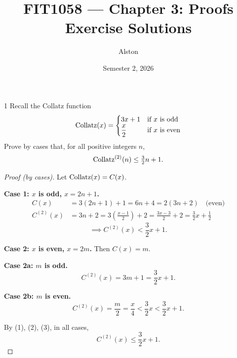 \documentclass[11pt]{article}
\title{FIT1058 --- Chapter 3: Proofs\\ \large Exercise Solutions}
\author{Alston}
\date{Semester 2, 2026}
\begin{document}
\maketitle

\begin{exercise}{1}
    Recall the Collatz function
    \[
        \operatorname{Collatz}(x) =
        \begin{cases}
            3x+1 & \text{if } x \text{ is odd} \\
            \dfrac{x}{2} & \text{if } x \text{ is even}
        \end{cases}
    \]
    Prove by cases that, for all positive integers $n$,
    \[
        \operatorname{Collatz}^{(2)}(n) \le \tfrac{3}{2}n + 1.
    \]
\end{exercise}
\begin{proof}[Proof (by cases)]
    Let $\operatorname{Collatz}(x) = C(x)$.

    \textbf{Case 1: $x$ is odd, $x=2n+1$.}
    \begin{align*}
        C(x) &= 3(2n+1)+1 = 6n+4 = 2(3n+2) \quad \text{(even)} \\
        C^{(2)}(x) &= 3n+2 = 3\left(\frac{x-1}{2}\right)+2
            = \frac{3x-3}{2}+2 = \frac{3}{2}x+\frac12
    \end{align*}
    \[
        \implies C^{(2)}(x) < \frac32 x+1. \tag{1}
    \]

    \textbf{Case 2: $x$ is even, $x=2m$.} Then $C(x)=m$.

    \textbf{Case 2a: $m$ is odd.}
    \[
        C^{(2)}(x) = 3m+1 = \frac32 x+1. \tag{2}
    \]

    \textbf{Case 2b: $m$ is even.}
    \[
        C^{(2)}(x) = \frac{m}{2} = \frac{x}{4}
            < \frac32 x < \frac32 x+1. \tag{3}
    \]

    By (1), (2), (3), in all cases,
    \[
        C^{(2)}(x) \le \frac32 x+1.
    \]
\end{proof}
\end{document}
